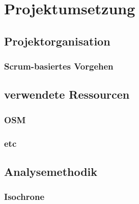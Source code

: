 \newpage
\section{Projektumsetzung} \label{infos}

\subsection{Projektorganisation}
\subsubsection{Scrum-basiertes Vorgehen}

\subsection{verwendete Ressourcen}
\subsubsection{OSM}
\subsubsection{etc}

\subsection{Analysemethodik}
\subsubsection{Isochrone}
